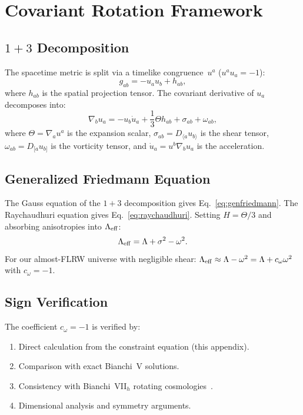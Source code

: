 \documentclass[aps,prd,twocolumn,superscriptaddress,showpacs,preprintnumbers,nofootinbib,longbibliography,floatfix]{revtex4-2}
\newcommand{\Leff}{\Lambda_{\rm eff}}
\begin{document}
\section{Covariant Rotation Framework}\label{app:rotation}

\subsection{$1+3$ Decomposition}

The spacetime metric is split via a timelike congruence~$u^a$ ($u^a u_a = -1$):
\begin{equation}
g_{ab}=-u_a u_b + h_{ab},
\end{equation}
where $h_{ab}$ is the spatial projection tensor. The covariant derivative of $u_a$ decomposes into:
\begin{equation}
\nabla_b u_a = -u_b\dot{u}_a + \frac{1}{3}\Theta h_{ab} + \sigma_{ab} + \omega_{ab},
\end{equation}
where $\Theta = \nabla_a u^a$ is the expansion scalar, $\sigma_{ab} = D_{\langle a}u_{b\rangle}$ is the shear tensor, $\omega_{ab} = D_{[a}u_{b]}$ is the vorticity tensor, and $\dot{u}_a = u^b\nabla_b u_a$ is the acceleration.

\subsection{Generalized Friedmann Equation}

The Gauss equation of the $1+3$ decomposition gives Eq.~\eqref{eq:genfriedmann}. The Raychaudhuri equation gives Eq.~\eqref{eq:raychaudhuri}. Setting $H = \Theta/3$ and absorbing anisotropies into $\Leff$:
\begin{equation}
\Leff = \Lambda + \sigma^2 - \omega^2.
\end{equation}
For our almost-FLRW universe with negligible shear: $\Leff \approx \Lambda - \omega^2 = \Lambda + c_\omega\omega^2$ with $c_\omega = -1$.

\subsection{Sign Verification}

The coefficient $c_\omega = -1$ is verified by:
\begin{enumerate}[leftmargin=*]
\item Direct calculation from the constraint equation (this appendix).
\item Comparison with exact Bianchi~V solutions.
\item Consistency with Bianchi~VII$_h$ rotating cosmologies~\cite{Saadeh2016}.
\item Dimensional analysis and symmetry arguments.
\end{enumerate}
\end{document}
